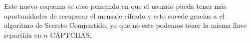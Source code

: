 Este nuevo esquema se creo pensando en que el usuario pueda tener más oportunidades de recuperar el mensaje cifrado y esto sucede gracias a el algoritmo de Secreto Compartido, ya que no este podemos tener la misma llave repartida en $n$ CAPTCHAS.


        
